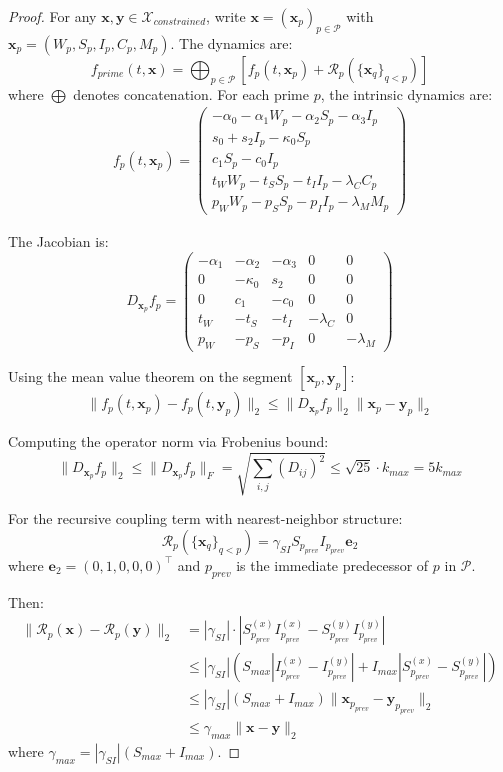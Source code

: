 \documentclass[11pt,letterpaper]{article}
\begin{document}
\begin{proof}
For any $\mathbf{x}, \mathbf{y} \in \mathcal{X}_{constrained}$, write $\mathbf{x} = (\mathbf{x}_p)_{p \in \mathcal{P}}$ with $\mathbf{x}_p = (W_p, S_p, I_p, C_p, M_p)$. The dynamics are:
\[
f_{prime}(t, \mathbf{x}) = \bigoplus_{p \in \mathcal{P}} \left[ f_p(t, \mathbf{x}_p) + \mathcal{R}_p(\{\mathbf{x}_q\}_{q < p}) \right]
\]
where $\bigoplus$ denotes concatenation. For each prime $p$, the intrinsic dynamics are:
\begin{align*}
f_p(t, \mathbf{x}_p) = \begin{pmatrix}
-\alpha_0 - \alpha_1 W_p - \alpha_2 S_p - \alpha_3 I_p \\
s_0 + s_2 I_p - \kappa_0 S_p \\
c_1 S_p - c_0 I_p \\
t_W W_p - t_S S_p - t_I I_p - \lambda_C C_p \\
p_W W_p - p_S S_p - p_I I_p - \lambda_M M_p
\end{pmatrix}
\end{align*}

The Jacobian is:
\[
D_{\mathbf{x}_p} f_p = \begin{pmatrix}
-\alpha_1 & -\alpha_2 & -\alpha_3 & 0 & 0 \\
0 & -\kappa_0 & s_2 & 0 & 0 \\
0 & c_1 & -c_0 & 0 & 0 \\
t_W & -t_S & -t_I & -\lambda_C & 0 \\
p_W & -p_S & -p_I & 0 & -\lambda_M
\end{pmatrix}
\]

Using the mean value theorem on the segment $[\mathbf{x}_p, \mathbf{y}_p]$:
\[
\|f_p(t, \mathbf{x}_p) - f_p(t, \mathbf{y}_p)\|_2 \leq \|D_{\mathbf{x}_p} f_p\|_2 \|\mathbf{x}_p - \mathbf{y}_p\|_2
\]

Computing the operator norm via Frobenius bound:
\[
\|D_{\mathbf{x}_p} f_p\|_2 \leq \|D_{\mathbf{x}_p} f_p\|_F = \sqrt{\sum_{i,j} (D_{ij})^2} \leq \sqrt{25} \cdot k_{max} = 5 k_{max}
\]

For the recursive coupling term with nearest-neighbor structure:
\[
\mathcal{R}_p(\{\mathbf{x}_q\}_{q<p}) = \gamma_{SI} S_{p_{prev}} I_{p_{prev}} \mathbf{e}_2
\]
where $\mathbf{e}_2 = (0,1,0,0,0)^\top$ and $p_{prev}$ is the immediate predecessor of $p$ in $\mathcal{P}$.

Then:
\begin{align*}
\|\mathcal{R}_p(\mathbf{x}) - \mathcal{R}_p(\mathbf{y})\|_2 &= |\gamma_{SI}| \cdot |S_{p_{prev}}^{(x)} I_{p_{prev}}^{(x)} - S_{p_{prev}}^{(y)} I_{p_{prev}}^{(y)}| \\
&\leq |\gamma_{SI}| (S_{max} |I_{p_{prev}}^{(x)} - I_{p_{prev}}^{(y)}| + I_{max} |S_{p_{prev}}^{(x)} - S_{p_{prev}}^{(y)}|) \\
&\leq |\gamma_{SI}| (S_{max} + I_{max}) \|\mathbf{x}_{p_{prev}} - \mathbf{y}_{p_{prev}}\|_2 \\
&\leq \gamma_{max} \|\mathbf{x} - \mathbf{y}\|_2
\end{align*}
where $\gamma_{max} = |\gamma_{SI}| (S_{max} + I_{max})$.


\end{proof}
\end{document}

